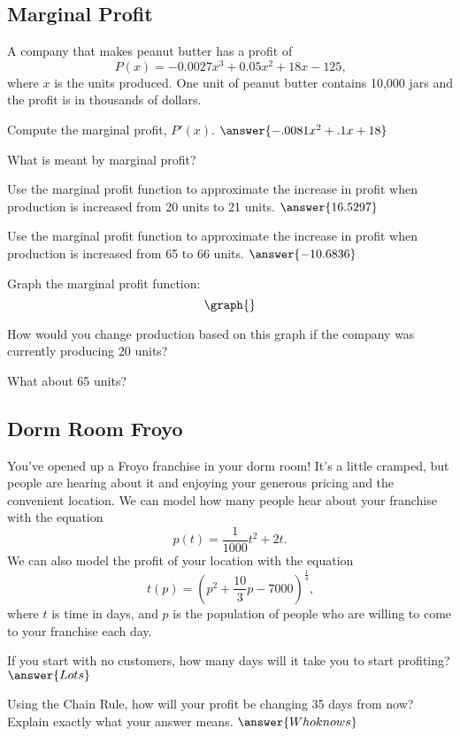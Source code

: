 \documentclass[handout]{ximera}
\begin{document}
\subsection{Marginal Profit}
A company that makes peanut butter has a profit of $$P(x)=-0.0027x^3+0.05x^2+18x-125\text{,}$$ where $x$ is the units produced. One unit of peanut butter contains 10,000 jars and the profit is in thousands of dollars.
\begin{question}
Compute the marginal profit, $P'(x)$. $\answer{-.0081x^2+.1x+18}$

What is meant by marginal profit?
\begin{freeResponse}
\end{freeResponse}
\end{question}
\begin{question}
Use the marginal profit function to approximate the increase in profit when production is increased from 20 units to 21 units.
$\answer{16.5297}$
\end{question}
\begin{question}
Use the marginal profit function to approximate the increase in profit when production is increased from 65 to 66 units. $\answer{-10.6836}$
\end{question}
\begin{question}
Graph the marginal profit function:
\[
\graph{}
\]

How would you change production based on this graph if the company was currently producing 20 units? 
\begin{multipleChoice}
\end{multipleChoice}
What about 65 units?
\begin{multipleChoice}
\end{multipleChoice}
\end{question}
\setcounter{problem}{0}
\subsection{Dorm Room Froyo}
You've opened up a Froyo franchise in your dorm room! It's a little cramped, but people are hearing about it and enjoying your generous pricing and the convenient location. We can model how many people hear about your franchise with the equation $$p(t) = \frac{1}{1000}t^2 + 2t \text{.}$$ We can also model the profit of your location with the equation $$t(p) = (p^2 + \frac{10}{3}p - 7000)^{\frac{1}{4}} \text{,}$$ where $t$ is time in days, and $p$ is the population of people who are willing to come to your franchise each day.
\begin{question}
If you start with no customers, how many days will it take you to start profiting?
$\answer{Lots}$
\end{question}
\begin{question}
Using the Chain Rule, how will your profit be changing 35 days from now? Explain exactly what your answer means.
$\answer{Who knows}$
\begin{freeResponse}
\end{freeResponse}
\end{question}
\end{document}
